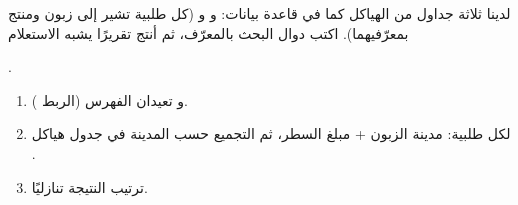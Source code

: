 \clearpage
{}

\begin{statement}
لدينا ثلاثة جداول من الهياكل كما في قاعدة بيانات:  و  و  (كل طلبية تشير إلى زبون ومنتج بمعرّفيهما). اكتب دوال البحث بالمعرّف، ثم أنتج تقريرًا يشبه الاستعلام \par{\centering\small{}\par}.
\end{statement}
\begin{stepsbox}\begin{enumerate}
\item {} و  تعيدان الفهرس (الربط \textbf{}).
\item لكل طلبية: مدينة الزبون + مبلغ السطر، ثم التجميع حسب المدينة في جدول هياكل .
\item ترتيب النتيجة تنازليًا.
\end{enumerate}\end{stepsbox}
